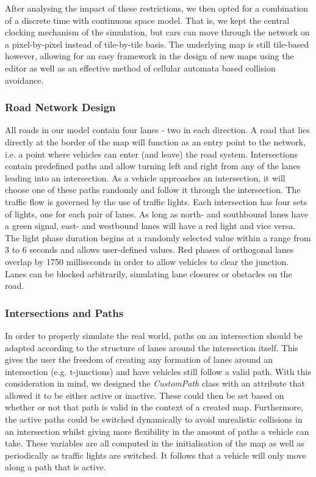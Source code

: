 After analysing the impact of these restrictions, we then opted for a combination of a discrete time with continuous space model. That is, we kept the central clocking mechanism of the simulation, but cars can move through the network on a pixel-by-pixel instead of tile-by-tile basis. The underlying map is still tile-based however, allowing for an easy framework in the design of new maps using the editor as well as an effective method of cellular automata based collision avoidance. 

\subsubsection*{Road Network Design}

All roads in our model contain four lanes - two in each direction. A road that lies directly at the border of the map will function as an entry point to the network, i.e. a point where vehicles can enter (and leave) the road system. Intersections contain predefined paths and allow turning left and right from any of the lanes leading into an intersection. As a vehicle approaches an intersection, it will choose one of these paths randomly and follow it through the intersection. The traffic flow is governed by the use of traffic lights. Each intersection has four sets of lights, one for each pair of lanes. As long as north- and southbound lanes have a green signal, east- and westbound lanes will have a red light and vice versa. The light phase duration begins at a randomly selected value within a range from 3 to 6 seconds and allows user-defined values. Red phases of orthogonal lanes overlap by 1750 milliseconds in order to allow vehicles to clear the junction. Lanes can be blocked arbitrarily, simulating lane closures or obstacles on the road.

\subsubsection*{Intersections and Paths}
In order to properly simulate the real world, paths on an intersection should be adapted according to the structure of lanes around the intersection itself. This gives the user the freedom of creating any formation of lanes around an intersection (e.g. t-junctions) and have vehicles still follow a valid path. With this consideration in mind, we designed the \textit{CustomPath} class with an attribute that allowed it to be either active or inactive. These could then be set based on whether or not that path is valid in the context of a created map. Furthermore, the active paths could be switched dynamically to avoid unrealistic collisions in an intersection whilst giving more flexibility in the amount of paths a vehicle can take. These variables are all computed in the initialisation of the map as well as periodically as traffic lights are switched. It follows that a vehicle will only move along a path that is active.



